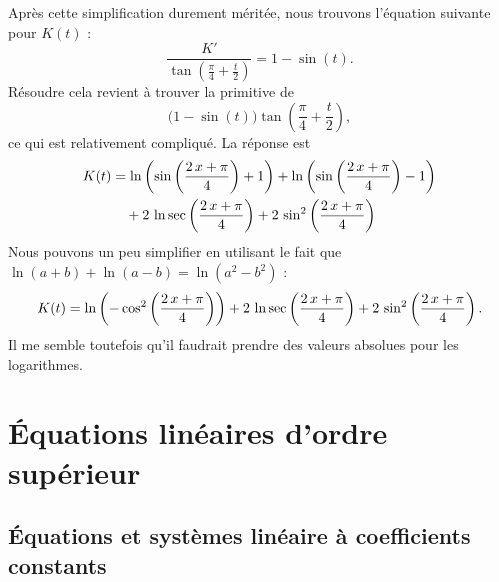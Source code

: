 \begin{example}
Après cette simplification durement méritée, nous trouvons l'équation suivante pour $K(t)$ :
\begin{equation}		\label{EDEqFracII107exoVVprb}
	\frac{ K' }{ \tan\left( \frac{ \pi }{ 4 }+\frac{ t }{ 2 } \right) }=1-\sin(t).
\end{equation}
Résoudre cela revient à trouver la primitive de
\begin{equation}
\big( 1-\sin(t) \big) \tan\left( \frac{ \pi }{ 4 }+\frac{ t }{ 2 } \right),
\end{equation}
ce qui est relativement compliqué. La réponse est
\begin{equation}
	\begin{aligned}[]
		K(t)	&=\ln \left(\sin \left({{2\,x+\pi}\over{4}}\right)+1\right)+\ln  \left(\sin \left({{2\,x+\pi}\over{4}}\right)-1\right)\\
			&\quad+2\,\ln \sec  \left({{2\,x+\pi}\over{4}}\right)+2\,\sin ^2\left({{2\,x+\pi}\over{4 }}\right)
	\end{aligned}
\end{equation}
Nous pouvons un peu simplifier en utilisant le fait que $\ln(a+b)+\ln(a-b)=\ln(a^2-b^2)$ :
\begin{equation}
	\begin{aligned}[]
		K(t)	=\ln\left(-\cos^2 \left({{2\,x+\pi}\over{4}}\right)\right)
			+2\,\ln \sec  \left({{2\,x+\pi}\over{4}}\right)+2\,\sin ^2\left({{2\,x+\pi}\over{4 }}\right).
	\end{aligned}
\end{equation}
Il me semble toutefois qu'il faudrait prendre des valeurs absolues pour les logarithmes.

\end{example}

\section{Équations linéaires d'ordre supérieur}

					\subsection{Équations et systèmes linéaire à coefficients constants}

